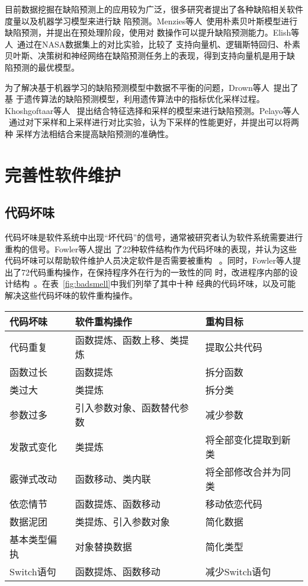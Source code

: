 目前数据挖掘在缺陷预测上的应用较为广泛，很多研究者提出了各种缺陷相关软件度量以及机器学习模型来进行缺
陷预测。Menzies等人~\cite{menzies2007data}使用朴素贝叶斯模型进行缺陷预测，并提出在预处理阶段，使用对
数操作可以提升缺陷预测能力。Elish等人~\cite{elish2008predicting}通过在NASA数据集上的对比实验，比较了
支持向量机、逻辑斯特回归、朴素贝叶斯、决策树和神经网络在缺陷预测任务上的表现，得到支持向量机是用于缺
陷预测的最优模型。

为了解决基于机器学习的缺陷预测模型中数据不平衡的问题，Drown等人~\cite{drown2009evolutionary}提出了基
于遗传算法的缺陷预测模型，利用遗传算法中的指标优化采样过程。Khoshgoftaar等人
~\cite{khoshgoftaar2010attribute}提出结合特征选择和采样的模型来进行缺陷预测。Pelayo等人
~\cite{pelayo2012evaluating}通过对下采样和上采样进行对比实验，认为下采样的性能更好，并提出可以将两种
采样方法相结合来提高缺陷预测的准确性。

\section{完善性软件维护}

\subsection{代码坏味}
代码坏味是软件系统中出现``坏代码''的信号，通常被研究者认为软件系统需要进行重构的信号。Fowler等人提出
了22种软件结构作为代码坏味的表现，并认为这些代码坏味可以帮助软件维护人员决定软件是否需要被重构
~\cite{fowler1999refactoring}。同时，Fowler等人提出了72代码重构操作，在保持程序外在行为的一致性的同
时，改进程序内部的设计结构~\cite{fowler1999refactoring}。在表~\ref{fig:badsmell}中我们列举了其中十种
经典的代码坏味，以及可能解决这些代码坏味的软件重构操作。

\begin{center}
\zihaowu
{}\label{fig:badsmell}
\begin{tabular}{lll}
\toprule
 代码坏味 & 软件重构操作 & 重构目标\\ \midrule
 代码重复 & 函数提炼、函数上移、类提炼 & 提取公共代码\\ 
 函数过长 & 函数提炼 & 拆分函数\\ 
 类过大 & 类提炼 & 拆分类\\ 
 参数过多 & 引入参数对象、函数替代参数 & 减少参数\\ 
 发散式变化& 类提炼 & 将全部变化提取到新类\\ 
 霰弹式改动& 函数移动、类内联 & 将全部修改合并为同类\\ 
 依恋情节& 函数提炼、函数移动 & 移动依恋代码\\ 
 数据泥团& 类提炼、引入参数对象 & 简化数据\\ 
 基本类型偏执& 对象替换数据 & 简化类型 \\ 
 Switch语句 & 函数提炼、函数移动 & 减少Switch语句\\ 
\bottomrule
\end{tabular}
\end{center}

